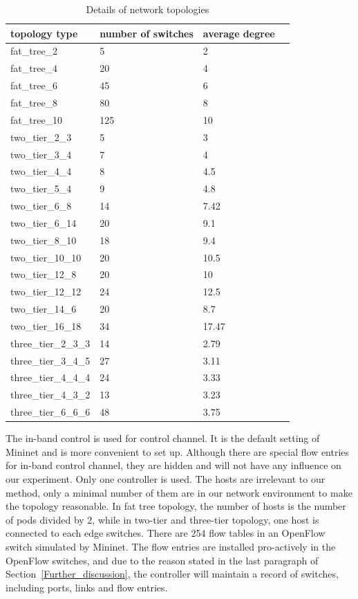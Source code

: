 \begin{table}[H]
\centering
\caption{Details of network topologies}
\begin{tabular}{|l||l|l|l|}
\hline topology type & number of switches & average degree \\
\hline
\hline fat\_tree\_2 & 5 & 2 \\
\hline fat\_tree\_4 & 20 & 4 \\
\hline fat\_tree\_6 & 45 & 6 \\
\hline fat\_tree\_8 & 80 & 8 \\
\hline fat\_tree\_10 & 125 & 10 \\
\hline 
\hline two\_tier\_2\_3 & 5 & 3 \\
\hline two\_tier\_3\_4 & 7 & 4 \\
\hline two\_tier\_4\_4 & 8 & 4.5 \\
\hline two\_tier\_5\_4 & 9 & 4.8 \\
\hline two\_tier\_6\_8 & 14 & 7.42 \\
\hline two\_tier\_6\_14 & 20 & 9.1 \\
\hline two\_tier\_8\_10 & 18 & 9.4 \\
\hline two\_tier\_10\_10 & 20 & 10.5 \\
\hline two\_tier\_12\_8 & 20 & 10 \\
\hline two\_tier\_12\_12 & 24 & 12.5 \\
\hline two\_tier\_14\_6 & 20 & 8.7 \\
\hline two\_tier\_16\_18 & 34 & 17.47 \\
\hline 
\hline three\_tier\_2\_3\_3 & 14 & 2.79 \\
\hline three\_tier\_3\_4\_5 & 27 & 3.11 \\
\hline three\_tier\_4\_4\_4 & 24 & 3.33 \\
\hline three\_tier\_4\_3\_2 & 13 & 3.23 \\
\hline three\_tier\_6\_6\_6 & 48 & 3.75 \\
\hline 
\end{tabular}
\label{table:network_env}
\end{table}

The in-band control is used for control channel. It is the default setting of Mininet and is more convenient to set up. Although there are special flow entries for in-band control channel, they are hidden and will not have any influence on our experiment. Only one controller is used. The hosts are irrelevant to our method, only a minimal number of them are in our network environment to make the topology reasonable. In fat tree topology, the number of hosts is the number of pods divided by 2, while in two-tier and three-tier topology, one host is connected to each edge switches. There are 254 flow tables in an OpenFlow switch simulated by Mininet. The flow entries are installed pro-actively in the OpenFlow switches, and due to the reason stated in the last paragraph of Section~\ref{Further_discussion}, the controller will maintain a record of switches, including ports, links and flow entries. 

